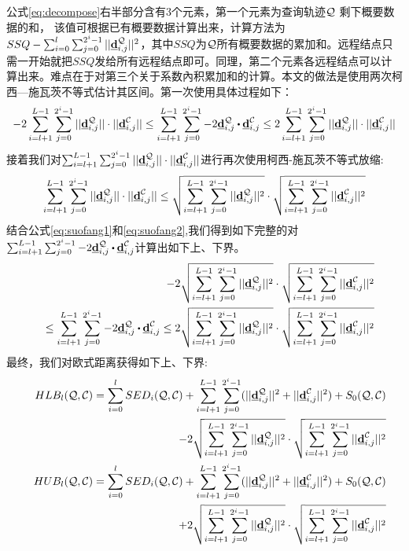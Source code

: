 公式\ref{eq:decompose}右半部分含有3个元素，第一个元素为查询轨迹$\cal Q$ 剩下概要数据的和， 该值可根据已有概要数据计算出来，计算方法为$SSQ-\sum_{i=0}^{l}\sum_{j=0}^{2^i-1}||\emph{{\textbf{d}}}_{i,j}^{\cal Q}||^2$，其中$SSQ$为$\cal Q$所有概要数据的累加和。远程结点只需一开始就把$SSQ$发给所有远程结点即可。同理，第二个元素各远程结点可以计算出来。难点在于对第三个关于系数內积累加和的计算。本文的做法是使用两次柯西—施瓦茨不等式估计其区间。第一次使用具体过程如下：
\begin{eqnarray}\label{eq:suofang1}
	-2\sum_{i=l+1}^{L-1}\sum_{j=0}^{2^i-1} ||\vd_{i,j}^{\cal Q}||\cdot ||\vd_{i,j}^{\cal C}||
	\le  \sum_{i=l+1}^{L-1}\sum_{j=0}^{2^i-1} -2\vd_{i,j}^{\cal Q}\bigcdot \vd_{i,j}^{\cal C} 
	\le  2\sum_{i=l+1}^{L-1}\sum_{j=0}^{2^i-1} ||\vd_{i,j}^{\cal Q}||\cdot ||\vd_{i,j}^{\cal C}||
\end{eqnarray}
接着我们对$\sum_{i=l+1}^{L-1}\sum_{j=0}^{2^i-1} ||\emph{{\textbf{d}}}_{i,j}^{\cal Q}||\cdot ||\emph{{\textbf{d}}}_{i,j}^{\cal C}||$进行再次使用柯西-施瓦茨不等式放缩:
\begin{eqnarray}\label{eq:suofang2}
\sum_{i=l+1}^{L-1}\sum_{j=0}^{2^i-1} ||\emph{{\textbf{d}}}_{i,j}^{\cal Q}||\cdot ||\emph{{\textbf{d}}}_{i,j}^{\cal C}|| \le 
	\sqrt{\sum_{i=l+1}^{L-1}\sum_{j=0}^{2^i-1}||\emph{{\textbf{d}}}_{i,j}^{\cal Q}||^2} \cdot \sqrt{\sum_{i=l+1}^{L-1}\sum_{j=0}^{2^i-1}||\emph{{\textbf{d}}}_{i,j}^{\cal C}||^2}
\end{eqnarray}
结合公式\ref{eq:suofang1}和\ref{eq:suofang2},我们得到如下完整的对$\sum_{i=l+1}^{L-1}\sum_{j=0}^{2^i-1} -2\vd_{i,j}^{\cal Q}\bigcdot \vd_{i,j}^{\cal C} $计算出如下上、下界。
 \begin{eqnarray}\label{eq:bound}
&&-2\sqrt{\sum_{i=l+1}^{L-1}\sum_{j=0}^{2^i-1}||\vd_{i,j}^{\cal Q}||^2} \cdot \sqrt{\sum_{i=l+1}^{L-1}\sum_{j=0}^{2^i-1}||\vd_{i,j}^{\cal C}||^2} \nonumber \\
&& 
\le  \sum_{i=l+1}^{L-1}\sum_{j=0}^{2^i-1} -2\vd_{i,j}^{\cal Q}\bigcdot \vd_{i,j}^{\cal C} 
\le  2\sqrt{\sum_{i=l+1}^{L-1}\sum_{j=0}^{2^i-1}||\vd_{i,j}^{\cal Q}||^2} \cdot \sqrt{\sum_{i=l+1}^{L-1}\sum_{j=0}^{2^i-1}||\vd_{i,j}^{\cal C}||^2}
\end{eqnarray}
最终，我们对欧式距离获得如下上、下界:
\allowdisplaybreaks
\begin{align} \label{eq:HaarBound}
&&	HLB_{l}({\cal Q},{\cal C}) =\sum_{i=0}^{l}SED_{i}({\cal Q},{\cal C})+
\sum_{i=l+1}^{L-1}\sum_{j=0}^{2^i-1}(||\emph{{\textbf{d}}}_{i,j}^{\cal Q}||^2+||\emph{{\textbf{d}}}_{i,j}^{\cal C}||^2)+ S_{0}({\cal Q},{\cal C}) \\
&&  - 2\sqrt{\sum_{i=l+1}^{L-1}\sum_{j=0}^{2^i-1}||\emph{{\textbf{d}}}_{i,j}^{\cal Q}||^2} \cdot \sqrt{\sum_{i=l+1}^{L-1}\sum_{j=0}^{2^i-1}||\emph{{\textbf{d}}}_{i,j}^{\cal C}||^2} \nonumber \\
&&	HUB_{l}({\cal Q},{\cal C}) = \sum_{i=0}^{l}SED_{i}({\cal Q},{\cal C})+
\sum_{i=l+1}^{L-1}\sum_{j=0}^{2^i-1}(||\emph{{\textbf{d}}}_{i,j}^{\cal Q}||^2+||\emph{{\textbf{d}}}_{i,j}^{\cal C}||^2)+S_{0}({\cal Q},{\cal C}) 
\nonumber \\
&&\qquad \quad + 2\sqrt{\sum_{i=l+1}^{L-1}\sum_{j=0}^{2^i-1}||\emph{{\textbf{d}}}_{i,j}^{\cal Q}||^2} \cdot \sqrt{\sum_{i=l+1}^{L-1}\sum_{j=0}^{2^i-1}||\emph{{\textbf{d}}}_{i,j}^{\cal C}||^2}
\end{align}
\allowdisplaybreaks[4]

